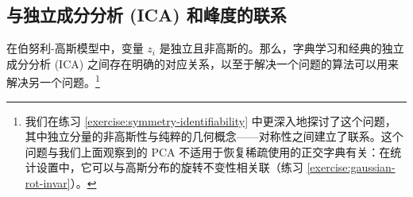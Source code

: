 \documentclass[../../book-main.tex]{subfiles}
\begin{document}


%
%
%
%



\subsection{与独立成分分析 (ICA) 和峰度的联系}
在伯努利-高斯模型中，变量 $z_i$ 是独立且非高斯的。那么，字典学习和经典的独立成分分析 (ICA) 之间存在明确的对应关系，以至于解决一个问题的算法可以用来解决另一个问题。\footnote{我们在练习 \ref{exercise:symmetry-identifiability} 中更深入地探讨了这个问题，其中独立分量的非高斯性与纯粹的几何概念——对称性之间建立了联系。这个问题与我们上面观察到的 PCA 不适用于恢复稀疏使用的正交字典有关：在统计设置中，它可以与高斯分布的旋转不变性相关联（练习 \ref{exercise:gaussian-rot-invar}）。} 
\end{document}
